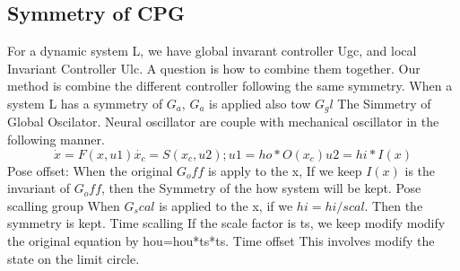 \subsection{Symmetry of CPG}
For a dynamic system L, we have global invarant controller  Ugc, and local Invariant Controller Ulc.
A question is how to combine them together.
Our method is combine the different controller following the same symmetry.
When a system L has a symmetry of $G_a$, $G_a$ is applied also tow $G_gl$
The Simmetry of Global Oscilator.
Neural oscillator are couple with mechanical oscillator in the following manner.
\begin{equation}
\dot{x}=F(x,u1)
\dot{x_c}=S(x_c,u2);
u1=ho*O(x_c)
u2=hi*I(x)
\end{equation}
Pose offset:
When the original $G_off$ is apply to the x,
If we keep $I(x)$ is the invariant of $G_off$, then the Symmetry of the how system will be kept.
Pose scalling group
When $G_scal$ is applied to the x, if we $hi=hi/scal$.
Then the symmetry is kept.
Time scalling
If the scale factor is ts, we keep modify modify the original equation by %
hou=hou*ts*ts.
Time offset
This involves modify the state on the limit circle.



